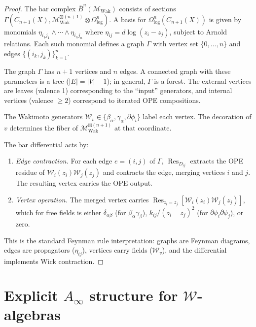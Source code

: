 \begin{proof}
The bar complex $\bar{B}^n(\mathcal{M}_{\mathrm{Wak}})$ consists of sections $\Gamma(\overline{C}_{n+1}(X), \mathcal{M}_{\mathrm{Wak}}^{\boxtimes(n+1)} \otimes \Omega^n_{\log})$.  A basis for $\Omega^n_{\log}(\overline{C}_{n+1}(X))$ is given by monomials $\eta_{i_1 j_1} \wedge \cdots \wedge \eta_{i_n j_n}$ where $\eta_{ij} = d\log(z_i - z_j)$, subject to Arnold relations.  Each such monomial defines a graph $\Gamma$ with vertex set $\{0, \ldots, n\}$ and edges $\{(i_k, j_k)\}_{k=1}^n$.

The graph $\Gamma$ has $n+1$ vertices and $n$ edges.  A connected graph with these parameters is a tree ($|E| = |V| - 1$); in general, $\Gamma$ is a forest.  The external vertices are leaves (valence 1) corresponding to the ``input'' generators, and internal vertices (valence $\geq 2$) correspond to iterated OPE compositions.

The Wakimoto generators $\mathcal{W}_v \in \{\beta_\alpha, \gamma_\alpha, \partial\phi_i\}$ label each vertex.  The decoration of $v$ determines the fiber of $\mathcal{M}_{\mathrm{Wak}}^{\boxtimes(n+1)}$ at that coordinate.

The bar differential acts by:
\begin{enumerate}
\item \emph{Edge contraction.} For each edge $e = (i,j)$ of $\Gamma$, $\operatorname{Res}_{D_{ij}}$ extracts the OPE residue of $\mathcal{W}_i(z_i) \mathcal{W}_j(z_j)$ and contracts the edge, merging vertices $i$ and $j$.  The resulting vertex carries the OPE output.
\item \emph{Vertex operation.} The merged vertex carries $\operatorname{Res}_{z_i = z_j}[\mathcal{W}_i(z_i)\mathcal{W}_j(z_j)]$, which for free fields is either $\delta_{\alpha\beta}$ (for $\beta_\alpha \gamma_\beta$), $k_{ij}/(z_i - z_j)^2$ (for $\partial\phi_i \partial\phi_j$), or zero.
\end{enumerate}
This is the standard Feynman rule interpretation: graphs are Feynman diagrams, edges are propagators ($\eta_{ij}$), vertices carry fields ($\mathcal{W}_v$), and the differential implements Wick contraction.
\end{proof}
 
\section{\texorpdfstring{Explicit $A_\infty$ structure for $\mathcal{W}$-algebras}{Explicit A- structure for $\mathcal{W}$-algebras}}
 
